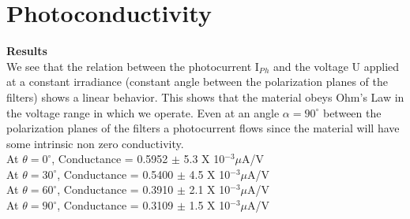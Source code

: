 \documentclass[12pt]{report}
\begin{document}
\newpage
\section{Photoconductivity}
\textbf{Results}\\
We see that the relation between the photocurrent I$_P$$_h$ and the voltage U applied at a constant irradiance (constant angle between the polarization planes of the filters) shows a linear behavior. This shows that the material obeys Ohm's Law in the voltage range in which we operate. Even at an angle $\alpha = 90^\circ$ between the polarization planes of the filters a photocurrent flows since the material will have some intrinsic non zero conductivity.\\
At $\theta = 0^\circ$, Conductance = 0.5952 $\pm$ 5.3 X 10$^{-3} \mu$A/V \\
At $\theta = 30^\circ$, Conductance = 0.5400 $\pm$ 4.5 X 10$^{-3} \mu$A/V \\
At $\theta = 60^\circ$, Conductance = 0.3910 $\pm$ 2.1 X 10$^{-3} \mu$A/V \\
At $\theta = 90^\circ$, Conductance = 0.3109 $\pm$ 1.5 X 10$^{-3} \mu$A/V 
\end{document}
